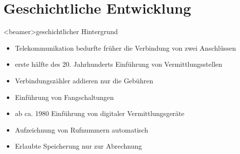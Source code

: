 
\section{Geschichtliche Entwicklung}
    \begin{frame}<beamer>{geschichtlicher Hintergrund}
      \begin{itemize}
        \item
          Telekommunikation bedurfte früher die Verbindung von zwei Anschlüssen
        \item
          erste hälfte des 20. Jahrhunderts Einführung von Vermittlungsstellen
        \item
          Verbindungszähler addieren nur die Gebühren
        \item
          Einführung von Fangschaltungen
        \item 
         ab ca. 1980 Einführung von digitaler Vermittlungsgeräte
        \item
          Aufzeichnung von Rufnummern automatisch
        \item
          Erlaubte Speicherung nur zur Abrechnung

      \end{itemize}
    \end{frame}

